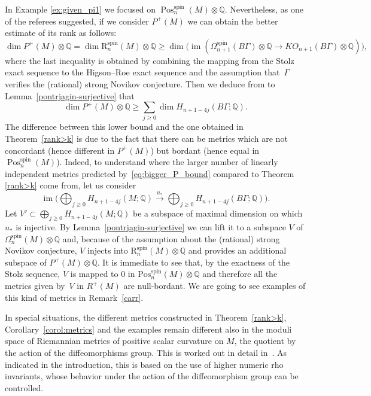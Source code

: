 \documentclass[pdftex]{sigma}
\numberwithin{equation}{section}
\def\QQ{\ensuremath{\mathbb{Q}}}
\newcommand{\rationals}{\mathbb{Q}}
\newcommand{\tensor}{\otimes}
\DeclareMathOperator{\Pos}{Pos}
\DeclareMathOperator{\im}{im}
\DeclareMathOperator{\spin}{spin}
\begin{document}
\begin{Remark}In Example \ref{ex:given_pi1} we focused on $\Pos^{\spin}_n(M)\tensor\rationals$. Nevertheless, as one of the referees suggested, if we consider $P^+(M)$ we can obtain the better estimate of its rank as follows:
 \begin{equation*}
 \dim P^+(M)\otimes\QQ= \dim \mathrm{R}^{\spin}_n(M)\tensor\rationals\geq
 \dim \big(\im(\Omega^{\spin}_{n+1}(B\Gamma)\otimes\QQ\to KO_{n+1}(B\Gamma)\otimes\QQ)\big),
 \end{equation*}
 where the last inequality is obtained by combining the mapping
 from the Stolz exact sequence to the Higson--Roe exact
 sequence and the assumption that~$\Gamma$ verifies the
 (rational) strong Novikov conjecture. Then we deduce from to Lemma~\ref{pontrjagin-surjective} that
 \begin{equation}\label{eq:bigger_P_bound}
 \dim P^+(M)\otimes\QQ\geq \sum_{j\geq0}\dim H_{n+1-4j}(B\Gamma;\QQ).\end{equation}
 The difference between this lower bound and the one obtained
 in Theorem~\ref{rank>k} is due to the fact that there
 can be metrics which are not concordant (hence different in
 $P^+(M)$) but bordant (hence equal in $\Pos^{\spin}_n(M)$).
 Indeed, to understand where the larger number of linearly
 independent metrics predicted by~\eqref{eq:bigger_P_bound}
 compared to Theorem \ref{rank>k} come from, let us
 consider \[\im\bigg(\bigoplus_{j\geq0}H_{n+1-4j}(M;\QQ)\xrightarrow{u_*}
 \bigoplus_{j\geq0}H_{n+1-4j}(B\Gamma;\QQ)\bigg).\] Let $V'\subset
 \bigoplus_{j\geq0}H_{n+1-4j}(M;\QQ)$ be a subspace of maximal
 dimension on which $u_*$ is injective. By Lemma~\ref{pontrjagin-surjective} we can lift it to a subspace $V$ of
 $\Omega_n^{\spin}(M)\tensor\rationals$ and, because of the
 assumption about the (rational)
strong Novikov conjecture, $V$ injects into
 $\mathrm{R}^{\spin}_n(M)\otimes\QQ$ and provides an additional
 subspace of $P^+(M)\otimes\QQ$. It is immediate to see that, by
 the exactness of the Stolz sequence, $V$ is mapped to $0$ in $\mathrm{Pos}^{\spin}_n(M)\otimes\QQ$
 and therefore all the metrics given by~$V$ in $R^+(M)$ are
 null-bordant.
 We are going to see examples of this kind of metrics in Remark~\ref{carr}.
\end{Remark}

\begin{Remark}
 In special situations, the different metrics constructed in Theorem~\ref{rank>k}, Corollary~\ref{corol:metrics} and the examples remain
 different also in the moduli space of Riemannian metrics of positive scalar
 curvature on $M$, the quotient by the action of the diffeomorphisms
 group. This is worked out in detail in~\cite{PiazzaSchickZenobi_pairing}. As indicated in the introduction, this is based
 on the use of higher numeric rho invariants, whose behavior under the action
 of the diffeomorphism group can be controlled.
\end{Remark}
\end{document}
